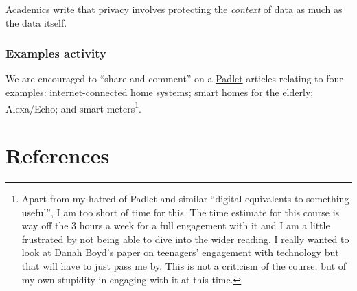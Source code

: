 \documentclass[
]{book}
\begin{document}
Academics write that privacy involves protecting the \emph{context} of data as much as the data itself.

\hypertarget{examples-activity}{%
\subsection{Examples activity}\label{examples-activity}}

We are encouraged to ``share and comment'' on a \href{https://padlet.com/moocdeliveryteam/m6er1x8gmb8t6b2j}{Padlet} articles relating to four examples: internet-connected home systems; smart homes for the elderly; Alexa/Echo; and smart meters\footnote{Apart from my hatred of Padlet and similar ``digital equivalents to something useful'', I am too short of time for this. The time estimate for this course is way off the 3 hours a week for a full engagement with it and I am a little frustrated by not being able to dive into the wider reading. I really wanted to look at Danah Boyd's paper on teenagers' engagement with technology but that will have to just pass me by. This is not a criticism of the course, but of my own stupidity in engaging with it at this time.}.

\hypertarget{references}{%
\chapter*{References}\label{references}}
\end{document}
